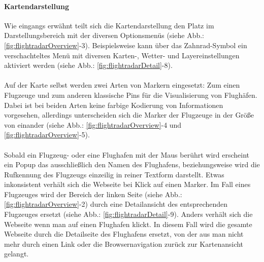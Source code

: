 \documentclass[../Bachelorarbeit.tex]{subfiles}
\begin{document}
\paragraph{Kartendarstellung}
\label{flightradarMap}
Wie eingangs erwähnt teilt sich die Kartendarstellung den Platz im Darstellungsbereich mit der diversen Optionsmenüs (siehe Abb.: \ref{fig:flightradarOverview}-3). 
Beispielsweise kann über das Zahnrad-Symbol ein verschachteltes Menü mit diversen Karten-, Wetter- und Layereinstellungen aktiviert werden (siehe Abb.: \ref{fig:flightradarDetail}-8).\\
\\
Auf der Karte selbst werden zwei Arten von Markern eingesetzt: 
Zum einen Flugzeuge und zum anderen klassische Pins für die Visualisierung von Flughäfen.
Dabei ist bei beiden Arten keine farbige Kodierung von Informationen vorgesehen, allerdings unterscheiden sich die Marker der Flugzeuge in der Größe von einander (siehe Abb.: \ref{fig:flightradarOverview}-4 und \ref{fig:flightradarOverview}-5).\\
\\
Sobald ein Flugzeug- oder eine Flughafen mit der Maus berührt wird erscheint ein Popup das ausschließlich den Namen des Flughafens, beziehungsweise wird die Rufkennung des Flugzeugs einzeilig in reiner Textform darstellt.
Etwas inkonsistent verhält sich die Webseite bei Klick auf einen Marker.
Im Fall eines Flugzeuges wird der Bereich der linken Seite (siehe Abb.: \ref{fig:flightradarOverview}-2) durch eine Detailansicht des entsprechenden Flugzeuges ersetzt (siehe Abb.: \ref{fig:flightradarDetail}-9).
Anders verhält sich die Webseite wenn man auf einen Flughafen klickt. 
In diesem Fall wird die gesamte Webseite durch die Detailseite des Flughafens ersetzt, von der aus man nicht mehr durch einen Link oder die Browsernavigation zurück zur Kartenansicht gelangt.
\end{document}
